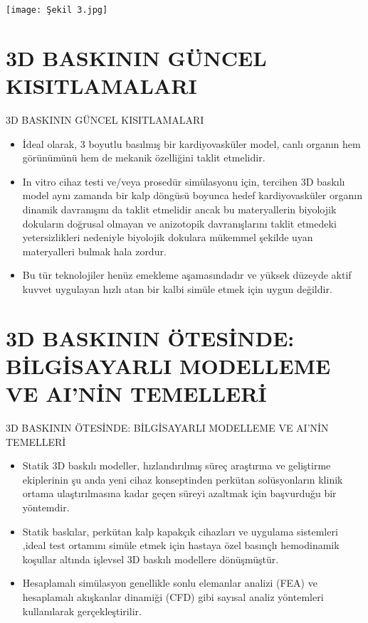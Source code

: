 \documentclass{beamer}
\begin{document}
\begin{frame}{}
\begin{block}{}
\texttt{[image: Şekil 3.jpg]}
\end{block}
\end{frame}

\section{3D BASKININ GÜNCEL KISITLAMALARI}

\begin{frame}{3D BASKININ GÜNCEL KISITLAMALARI}

\begin{itemize}
  \item İdeal olarak, 3 boyutlu basılmış bir kardiyovasküler model, canlı organın hem görünümünü hem de mekanik özelliğini taklit etmelidir. 
  \item In vitro cihaz testi ve/veya prosedür simülasyonu için, tercihen 3D baskılı model aynı zamanda bir kalp döngüsü boyunca hedef kardiyovasküler organın dinamik davranışını da taklit etmelidir ancak bu materyallerin biyolojik dokuların doğrusal olmayan ve anizotopik davranışlarını taklit etmedeki yetersizlikleri nedeniyle biyolojik dokulara mükemmel şekilde uyan materyalleri bulmak hala zordur. 
  \item Bu tür teknolojiler henüz emekleme aşamasındadır ve yüksek düzeyde aktif kuvvet uygulayan hızlı atan bir kalbi simüle etmek için uygun değildir. 
\end{itemize}

\end{frame}

\section{3D BASKININ ÖTESİNDE: BİLGİSAYARLI MODELLEME VE AI'NİN TEMELLERİ}

\begin{frame}{3D BASKININ ÖTESİNDE: BİLGİSAYARLI MODELLEME VE AI'NİN TEMELLERİ}

\begin{itemize}
  \item Statik 3D baskılı modeller, hızlandırılmış süreç araştırma ve geliştirme ekiplerinin şu anda yeni cihaz konseptinden perkütan solüsyonların klinik ortama ulaştırılmasına kadar geçen süreyi azaltmak için başvurduğu bir yöntemdir. 
  \item Statik baskılar, perkütan kalp kapakçık cihazları ve uygulama sistemleri ,ideal test ortamını simüle etmek için hastaya özel basınçlı hemodinamik koşullar altında işlevsel 3D baskılı modellere dönüşmüştür. 
  \item Hesaplamalı simülasyon genellikle sonlu elemanlar analizi (FEA) ve hesaplamalı akışkanlar dinamiği (CFD) gibi sayısal analiz yöntemleri kullanılarak gerçekleştirilir. 
\end{itemize}

\end{frame}
\end{document}
